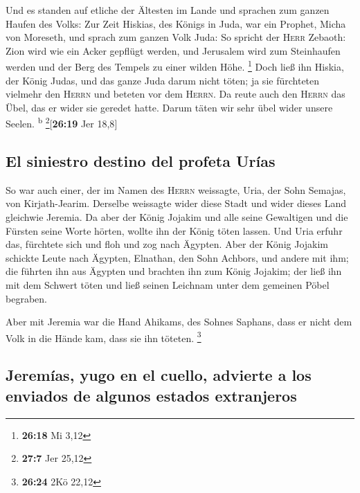  Und es standen auf etliche der Ältesten im Lande und
sprachen zum ganzen Haufen des Volks:  Zur Zeit Hiskias,
des Königs in Juda, war ein Prophet, Micha von Moreseth, und sprach zum
ganzen Volk Juda: So spricht der \textsc{Herr} Zebaoth: Zion wird wie
ein Acker gepflügt werden, und Jerusalem wird zum Steinhaufen werden und
der Berg des Tempels zu einer wilden Höhe. \footnote{\textbf{26:18} Mi
  3,12}  Doch ließ ihn Hiskia, der König Judas, und das
ganze Juda darum nicht töten; ja sie fürchteten vielmehr den
\textsc{Herrn} und beteten vor dem \textsc{Herrn}. Da reute auch den
\textsc{Herrn} das Übel, das er wider sie geredet hatte. Darum täten wir
sehr übel wider unsere Seelen. \textsuperscript{b}
\footnote{\textbf{27:7} Jer 25,12}{[}\textbf{26:19} Jer 18,8{]}

\hypertarget{el-siniestro-destino-del-profeta-uruxedas}{%
\subsection{El siniestro destino del profeta
Urías}\label{el-siniestro-destino-del-profeta-uruxedas}}

 So war auch einer, der im Namen des \textsc{Herrn}
weissagte, Uria, der Sohn Semajas, von Kirjath-Jearim. Derselbe
weissagte wider diese Stadt und wider dieses Land gleichwie Jeremia.
 Da aber der König Jojakim und alle seine Gewaltigen und
die Fürsten seine Worte hörten, wollte ihn der König töten lassen. Und
Uria erfuhr das, fürchtete sich und floh und zog nach Ägypten.
 Aber der König Jojakim schickte Leute nach Ägypten,
Elnathan, den Sohn Achbors, und andere mit ihm;  die
führten ihn aus Ägypten und brachten ihn zum König Jojakim; der ließ ihn
mit dem Schwert töten und ließ seinen Leichnam unter dem gemeinen Pöbel
begraben.

 Aber mit Jeremia war die Hand Ahikams, des Sohnes
Saphans, dass er nicht dem Volk in die Hände kam, dass sie ihn töteten.
\footnote{\textbf{26:24} 2Kö 22,12}

\hypertarget{jeremuxedas-yugo-en-el-cuello-advierte-a-los-enviados-de-algunos-estados-extranjeros}{%
\subsection{Jeremías, yugo en el cuello, advierte a los enviados de
algunos estados
extranjeros}\label{jeremuxedas-yugo-en-el-cuello-advierte-a-los-enviados-de-algunos-estados-extranjeros}}

